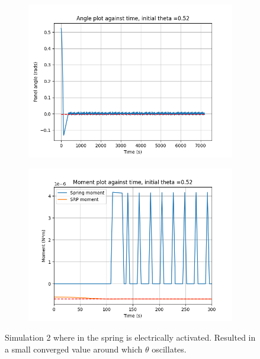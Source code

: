 \begin{figure}[!htb]
\centering
\begin{subfigure}{0.5\textwidth}
  \centering
  \includegraphics[width=1\linewidth]{images/second/theta_plot.png}
\end{subfigure}%
\begin{subfigure}{.5\textwidth}
  \centering
  \includegraphics[width=1\linewidth]{images/second/moment_plot.png}
\end{subfigure}
\caption{Simulation 2 where in the spring is electrically activated. Resulted in a small converged value around which $\theta$ oscillates.}
\label{fig:2_results}
\end{figure}


